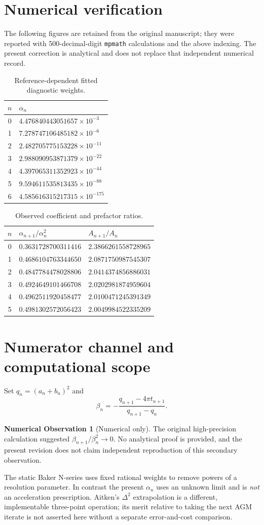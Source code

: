 \documentclass[11pt]{article}
\theoremstyle{definition}\newtheorem{remark}{Remark}\newtheorem{observation}{Numerical Observation}
\begin{document}
\section{Numerical verification}
The following figures are retained from the original manuscript; they were reported with 500-decimal-digit \texttt{mpmath} calculations and the above indexing. The present correction is analytical and does not replace that independent numerical record.
\begin{table}[ht]\centering\small
\begin{tabular}{cl}\toprule $n$ & $\alpha_n$ \\\midrule
0 & $4.476840443051657\times10^{-3}$\\
1 & $7.278747106485182\times10^{-6}$\\
2 & $2.482705775153228\times10^{-11}$\\
3 & $2.988090953871379\times10^{-22}$\\
4 & $4.397065311352923\times10^{-44}$\\
5 & $9.594611535813435\times10^{-88}$\\
6 & $4.585616315217315\times10^{-175}$\\\bottomrule
\end{tabular}\caption{Reference-dependent fitted diagnostic weights.}\end{table}
\begin{table}[ht]\centering\small
\begin{tabular}{cll}\toprule $n$ & $\alpha_{n+1}/\alpha_n^2$ & $A_{n+1}/A_n$\\\midrule
0 & $0.3631728700311416$ & $2.3866261558728965$\\
1 & $0.4686104763344650$ & $2.0871750987545307$\\
2 & $0.4847784478028806$ & $2.0414374856886031$\\
3 & $0.4924649101466708$ & $2.0202981874959604$\\
4 & $0.4962511920458477$ & $2.0100471245391349$\\
5 & $0.4981302572056423$ & $2.0049984522335209$\\\bottomrule
\end{tabular}\caption{Observed coefficient and prefactor ratios.}\end{table}
\section{Numerator channel and computational scope}
Set $q_n=(a_n+b_n)^2$ and
\[\beta_n=-\frac{q_{n+1}-4\pi t_{n+1}}{q_{n+1}-q_n}.\]
\begin{observation}[Numerical only]
The original high-precision calculation suggested $\beta_{n+1}/\beta_n^2\to0$. No analytical proof is provided, and the present revision does not claim independent reproduction of this secondary observation.
\end{observation}
The static Baker N-series uses fixed rational weights to remove powers of a resolution parameter. In contrast the present $\alpha_n$ uses an unknown limit and is \emph{not} an acceleration prescription. Aitken's $\Delta^2$ extrapolation is a different, implementable three-point operation; its merit relative to taking the next AGM iterate is not asserted here without a separate error-and-cost comparison.
\end{document}
